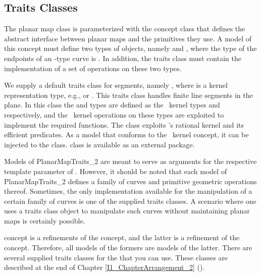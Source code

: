 \subsection{Traits Classes}
The planar map class is parameterized with the concept class
 that defines the abstract interface
between planar maps and the primitives they use. A model of this
concept must define two types of objects,
namely  and
, where the type of the endpoints of an
-type curve is . In
addition, the traits class must contain the implementation of a set of
operations on these two types.
                                          
We supply a default traits class for segments, namely
, where  is a
kernel representation type, e.g.,  or
. This traits class handles finite line segments in
the plane. In this class the
 and  types are
defined as the \cgal\ kernel types
 and 
respectively, and the \cgal\ kernel operations on these types are
exploited to implement the required functions.
The  class exploits \leda 's rational
kernel and its efficient predicates. As a model that conforms to the
\cgal\ kernel concept, it can be injected to the
 class.
 class is available as an external
package.

Models of PlanarMapTraits\_2 are meant to serve as arguments for the
respective template parameter of
. However, it should be noted
that each model of PlanarMapTraits\_2 defines a family of curves and
primitive geometric operations thereof. Sometimes, the only
implementation available for the manipulation of a certain family of
curves is one of the supplied traits classes. A scenario where one
uses a traits class object to manipulate such curves without
maintaining planar maps is certainly possible.

 concept is a refinements of the
 concept, and the latter is a
refinement of the  concept.
Therefore, all models of the formers are models of the latter. 
There are several supplied traits classes for the 
that you can use. These classes are described at the end of Chapter
\ref{I1_ChapterArrangement_2} ().

